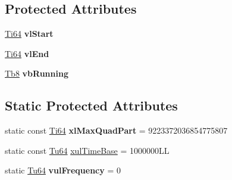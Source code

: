 \subsection*{Protected Attributes}
\begin{DoxyCompactItemize}
\item 
\mbox{\label{class_g_n_common_1_1_g_tc_stop_watch_a5eb07074a371c97819296a7db87b4d27}} 
\mbox{\hyperlink{namespace_g_n_common_ad0a34f67eefe81cfbd0e515bba246d9d}{Ti64}} {\bfseries vl\+Start}
\item 
\mbox{\label{class_g_n_common_1_1_g_tc_stop_watch_afc4a445f8c64577899076de34626ac6b}} 
\mbox{\hyperlink{namespace_g_n_common_ad0a34f67eefe81cfbd0e515bba246d9d}{Ti64}} {\bfseries vl\+End}
\item 
\mbox{\label{class_g_n_common_1_1_g_tc_stop_watch_a72fd2713ee3ed00290ccaad0fafad583}} 
\mbox{\hyperlink{namespace_g_n_common_a8115dc7ed53b6e5b52e6bfde1632ea74}{Tb8}} {\bfseries vb\+Running}
\end{DoxyCompactItemize}
\subsection*{Static Protected Attributes}
\begin{DoxyCompactItemize}
\item 
\mbox{\label{class_g_n_common_1_1_g_tc_stop_watch_aa4ea90c5c6272835e8f11b9b0b6a31b4}} 
static const \mbox{\hyperlink{namespace_g_n_common_ad0a34f67eefe81cfbd0e515bba246d9d}{Ti64}} {\bfseries xl\+Max\+Quad\+Part} = 9223372036854775807
\item 
static const \mbox{\hyperlink{namespace_g_n_common_a9404ee6090c788ae70aebd1436ceb97d}{Tu64}} \mbox{\hyperlink{class_g_n_common_1_1_g_tc_stop_watch_a525b6eebced7d4d9c3812788cfde2b75}{xul\+Time\+Base}} = 1000000\+LL
\item 
\mbox{\label{class_g_n_common_1_1_g_tc_stop_watch_ae62f93ce0dfb63d4f14ff7124002af12}} 
static \mbox{\hyperlink{namespace_g_n_common_a9404ee6090c788ae70aebd1436ceb97d}{Tu64}} {\bfseries vul\+Frequency} = 0
\end{DoxyCompactItemize}


